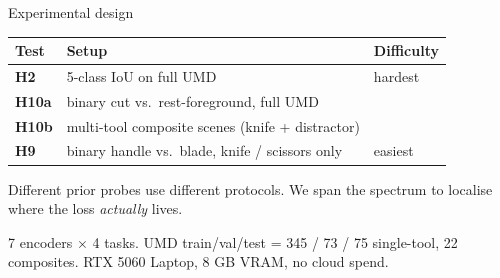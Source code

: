 \documentclass[10pt,aspectratio=169]{beamer}
\begin{document}
\begin{frame}{Experimental design }
  \vspace{0.4em}
  \begin{tabular}{l p{} l}
    \toprule
    Test & Setup & Difficulty \\
    \midrule
    \textbf{H2}    & 5-class IoU on full UMD                                    & hardest \\
    \textbf{H10a}  & binary cut vs.\ rest-foreground, full UMD                  & \\
    \textbf{H10b}  & multi-tool composite scenes \scriptsize(knife + distractor) & \\
    \textbf{H9}    & binary handle vs.\ blade, knife / scissors only            & easiest \\
    \bottomrule
  \end{tabular}

  \vspace{1.2em}
  Different prior probes use different protocols. We span the spectrum to localise where the loss \emph{actually} lives.

  \vspace{0.6em}
  {\small\color{muted}7 encoders $\times$ 4 tasks. UMD train/val/test = 345 / 73 / 75 single-tool, 22 composites. RTX 5060 Laptop, 8 GB VRAM, no cloud spend.}
\end{frame}
\end{document}
